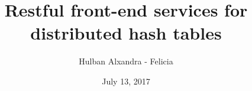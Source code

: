\documentclass[a4paper,12pt]{report}
\begin{document}
\title{Restful front-end services for distributed hash tables}
\date{July 13, 2017}
\author{Hulban Alxandra - Felicia}

\maketitle

\newpage

\tableofcontents

\newpage\cleardoublepage
\newpage\cleardoublepage
\newpage\cleardoublepage
\newpage\cleardoublepage
\end{document}
